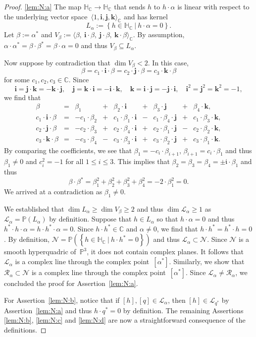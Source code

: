 \documentclass[10pt,a4paper]{amsart}
\newcommand{\C}{\mathbb{C}}
\newcommand{\HC}{\mathbb{H}_{\C}}
\renewcommand{\P}{\mathbb{P}}
\newcommand{\cL}{\mathcal{L}}
\newcommand{\cN}{\mathcal{N}}
\newcommand{\cR}{\mathcal{R}}
\newcommand{\ii}{\mathfrak{i}}
\newcommand{\qi}{\mathbf{i}}
\newcommand{\qj}{\mathbf{j}}
\newcommand{\qk}{\mathbf{k}}
\newcommand{\set}[2]{\left\{#1 ~|~ #2\right\}}
\begin{document}
\begin{proof}
\ref{lem:N:a}
The map $\HC\to\HC$ that sends $h$ to $h\cdot\alpha$ is linear
with respect to the underlying vector space~$\langle 1,\qi,\qj,\qk \rangle_\C$
and has kernel
\[
L_\alpha:=\set{h\in\HC}{h\cdot\alpha=0}.
\]
Let
$\beta:=\alpha^*$ and
$V_\beta:=\langle \beta,~\qi\cdot\beta,~\qj\cdot\beta,~\qk\cdot\beta\rangle_\C$.
By assumption,
$
\alpha\cdot\alpha^*=
\beta\cdot\beta^*=
\beta\cdot\alpha=0$ and thus $V_\beta\subseteq L_\alpha$.

Now suppose by contradiction that $\dim V_\beta<2$.
In this case,
\[
\beta=c_1\cdot\qi\cdot\beta=c_2\cdot\qj\cdot\beta=c_3\cdot\qk\cdot\beta
\]
for some $c_1,c_2,c_3\in\C$. Since
\[
\qi=\qj\cdot\qk=-\qk\cdot\qj,\quad
\qj=\qk\cdot\qi=-\qi\cdot\qk,\quad
\qk=\qi\cdot\qj=-\qj\cdot\qi,\quad
\qi^2=\qj^2=\qk^2=-1,
\]
we find that
\[
\begin{array}{rlrlrlrlr}
                \beta &=&          \beta_1 &+&         \beta_2\cdot\qi &+&         \beta_3\cdot\qj &+&         \beta_4\cdot\qk, \\
c_1\cdot\qi\cdot\beta &=& -c_1\cdot\beta_2 &+& c_1\cdot\beta_1\cdot\qi &-& c_1\cdot\beta_4\cdot\qj &+& c_1\cdot\beta_3\cdot\qk, \\
c_2\cdot\qj\cdot\beta &=& -c_2\cdot\beta_3 &+& c_2\cdot\beta_4\cdot\qi &+& c_2\cdot\beta_1\cdot\qj &-& c_2\cdot\beta_2\cdot\qk, \\
c_3\cdot\qk\cdot\beta &=& -c_3\cdot\beta_4 &-& c_3\cdot\beta_3\cdot\qi &+& c_3\cdot\beta_2\cdot\qj &+& c_3\cdot\beta_1\cdot\qk.
\end{array}
\]
By comparing the coefficients, we see that
$\beta_1=-c_i\cdot\beta_{i+1}$,
$\beta_{i+1}=c_i\cdot\beta_1$
and thus
$\beta_1\neq 0$ and
$c_i^2=-1$
for all $1\leq i\leq 3$.
This implies that $\beta_2=\beta_3=\beta_4=\pm\ii\cdot\beta_1$
and thus
\[
\beta\cdot\beta^*=\beta_1^2+\beta_2^2+\beta_3^2+\beta_4^2=-2\cdot\beta_1^2=0.
\]
We arrived at a contradiction as $\beta_1\neq 0$.

We established that $\dim L_\alpha\geq \dim V_\beta\geq 2$ and thus $\dim \cL_\alpha\geq 1$
as $\cL_\alpha=\P(L_\alpha)$ by definition.
Suppose that $h\in L_\alpha$ so that $h\cdot\alpha=0$ and thus $h^*\cdot h\cdot\alpha=h\cdot h^*\cdot\alpha=0$.
Since $h\cdot h^*\in\C$ and $\alpha\neq 0$, we find that $h\cdot h^*=h^*\cdot h=0$.
By definition, $\cN=\P(\set{h\in\HC}{h\cdot h^*=0})$
and thus $\cL_\alpha\subset\cN$.
Since $\cN$ is a smooth hyperquadric of~$\P^3$, it does not contain complex planes.
It follows that $\cL_\alpha$ is a complex line through the complex point~$[\alpha^*]$.
Similarly, we show that $\cR_\alpha\subset\cN$ is a complex line through the complex point~$[\alpha^*]$.
Since $\cL_\alpha\neq\cR_\alpha$, we concluded the proof for Assertion~\ref{lem:N:a}.

For Assertion~\ref{lem:N:b},
notice that if $[h],[q]\in \cL_\alpha$, then
$[h]\in \cL_{q^*}$ by Assertion~\ref{lem:N:a} and thus $h\cdot q^*=0$ by definition.
The remaining Assertions \ref{lem:N:b}, \ref{lem:N:c} and \ref{lem:N:d}
are now a straightforward consequence of the definitions.
\end{proof}
\end{document}
